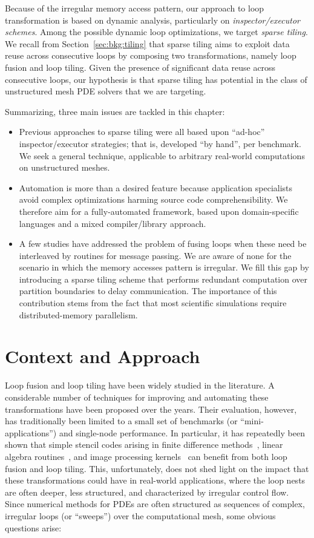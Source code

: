 Because of the irregular memory access pattern, our approach to loop transformation is based on dynamic analysis, particularly on \textit{inspector/executor schemes}. Among the possible dynamic loop optimizations, we target \textit{sparse tiling}. We recall from Section~\ref{sec:bkg:tiling} that sparse tiling aims to exploit data reuse across consecutive loops by composing two transformations, namely loop fusion and loop tiling. Given the presence of significant data reuse across consecutive loops, our hypothesis is that sparse tiling has potential in the class of unstructured mesh PDE solvers that we are targeting.

Summarizing, three main issues are tackled in this chapter:

\begin{itemize}
\item Previous approaches to sparse tiling were all based upon ``ad-hoc'' inspector/executor strategies; that is, developed ``by hand'', per benchmark. We seek a general technique, applicable to arbitrary real-world computations on unstructured meshes. 
\item Automation is more than a desired feature because application specialists avoid complex optimizations harming source code comprehensibility. We therefore aim for a fully-automated framework, based upon domain-specific languages and a mixed compiler/library approach.
\item A few studies have addressed the problem of fusing loops when these need be interleaved by routines for message passing. We are aware of none for the scenario in which the memory accesses pattern is irregular. We fill this gap by introducing a sparse tiling scheme that performs redundant computation over partition boundaries to delay communication. The importance of this contribution stems from the fact that most scientific simulations require distributed-memory parallelism.
\end{itemize}

\section{Context and Approach}
\label{sec:tiling:struct}
Loop fusion and loop tiling have been widely studied in the literature. A considerable number of techniques for improving and automating these transformations have been proposed over the years. Their evaluation, however, has traditionally been limited to a small set of benchmarks (or ``mini-applications'') and single-node performance. In particular, it has repeatedly been shown that simple stencil codes arising in finite difference methods~\citep{vect-tiled-ho-fd,ics-stencil-tiling,cohen-timetiling}, linear algebra routines~\citep{qr-fact-tiled,blas-tiling}, and image processing kernels~\citep{Halide} can benefit from both loop fusion and loop tiling. This, unfortunately, does not shed light on the impact that these transformations could have in real-world applications, where the loop nests are often deeper, less structured, and characterized by irregular control flow. Since numerical methods for PDEs are often structured as sequences of complex, irregular loops (or ``sweeps'') over the computational mesh, some obvious questions arise: 

